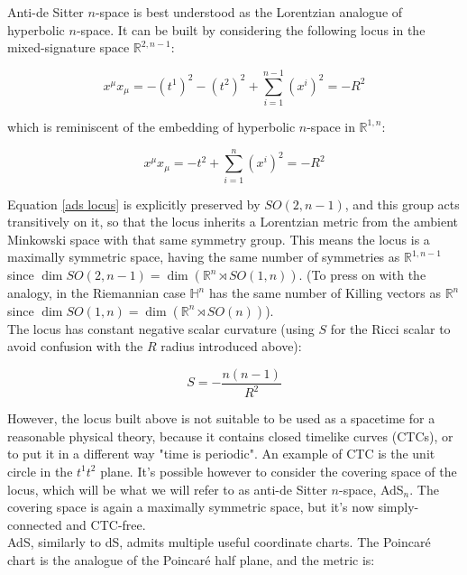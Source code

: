 \documentclass[11pt,a4paper,twoside,openright]{book}
\begin{document}
Anti-de Sitter $n$-space is best understood as the Lorentzian analogue of hyperbolic $n$-space. It can be built by considering the following locus in the mixed-signature space $\mathbb{R}^{2,n-1}$:

\begin{equation} \label{ads locus}
x^\mu x_\mu = -(t^1)^2 - (t^2)^2 + \sum_{i=1}^{n-1} (x^i)^2  =  - R^2
\end{equation}

which is reminiscent of the embedding of hyperbolic $n$-space in $\mathbb{R}^{1,n}$:

\begin{equation}
x^\mu x_\mu = -t^2 + \sum_{i=1}^{n} (x^i)^2 = - R^2
\end{equation}

Equation \ref{ads locus} is explicitly preserved by $SO(2,n-1)$, and this group acts transitively on it, so that the locus inherits a Lorentzian metric from the ambient Minkowski space with that same symmetry group. This means the locus is a maximally symmetric space, having the same number of symmetries as $\mathbb{R}^{1,n-1}$ since $\dim SO(2,n-1) = \dim \left( \mathbb{R}^n \rtimes SO(1,n) \right)$. (To press on with the analogy, in the Riemannian case $\mathbb{H}^n$ has the same number of Killing vectors as $\mathbb{R}^n$ since $\dim SO(1,n) = \dim \left(\mathbb{R}^n \rtimes SO(n) \right)$).\\

The locus has constant negative scalar curvature (using $S$ for the Ricci scalar to avoid confusion with the $R$ radius introduced above):

\begin{equation}
S = - \frac{n(n-1)}{R^2} 
\end{equation}

However, the locus built above is not suitable to be used as a spacetime for a reasonable physical theory, because it contains closed timelike curves (CTCs), or to put it in a different way "time is periodic". An example of CTC is the unit circle in the $t^1 t^2$ plane. It's possible however to consider the covering space of the locus, which will be what we will refer to as anti-de Sitter $n$-space, AdS$_n$. The covering space is again a maximally symmetric space, but it's now simply-connected and CTC-free.\\

AdS, similarly to dS, admits multiple useful coordinate charts. The Poincaré chart is the analogue of the Poincaré half plane, and the metric is:
\end{document}
